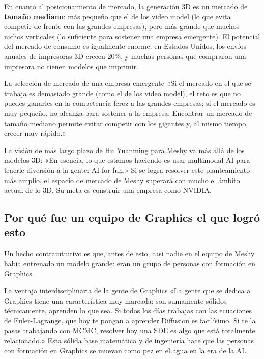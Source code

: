 \documentclass[a4paper]{article}
\begin{document}
En cuanto al posicionamiento de mercado, la generación 3D es un mercado de \textbf{tamaño mediano}: más pequeño que el de los video model (lo que evita competir de frente con las grandes empresas), pero más grande que muchos nichos verticales (lo suficiente para sostener una empresa emergente). El potencial del mercado de consumo es igualmente enorme: en Estados Unidos, los envíos anuales de impresoras 3D crecen 20\%, y muchas personas que compraron una impresora no tienen modelos que imprimir.

\begin{warningbox}{La selección de mercado de una empresa emergente}
«Si el mercado en el que se trabaja es demasiado grande (como el de los video model), el reto es que no puedes ganarles en la competencia feroz a las grandes empresas; si el mercado es muy pequeño, no alcanza para sostener a la empresa. Encontrar un mercado de tamaño mediano permite evitar competir con los gigantes y, al mismo tiempo, crecer muy rápido.»
\end{warningbox}

La visión de más largo plazo de Hu Yuanming para Meshy va más allá de los modelos 3D: «En esencia, lo que estamos haciendo es usar multimodal AI para traerle diversión a la gente: AI for fun.» Si se logra resolver este planteamiento más amplio, el espacio de mercado de Meshy superará con mucho el ámbito actual de lo 3D. Su meta es construir una empresa como NVIDIA.

\subsection{Por qué fue un equipo de Graphics el que logró esto}

Un hecho contraintuitivo es que, antes de esto, casi nadie en el equipo de Meshy había entrenado un modelo grande: eran un grupo de personas con formación en Graphics.

\begin{knowledgebox}{La ventaja interdisciplinaria de la gente de Graphics}
«La gente que se dedica a Graphics tiene una característica muy marcada: son sumamente sólidos técnicamente, aprenden lo que sea. Si todos los días trabajas con las ecuaciones de Euler-Lagrange, que hoy te pongan a aprender Diffusion es facilísimo. Si te la pasas trabajando con MCMC, resolver hoy una SDE es algo que está totalmente relacionado.» Esta sólida base matemática y de ingeniería hace que las personas con formación en Graphics se muevan como pez en el agua en la era de la AI.
\end{knowledgebox}
\end{document}
